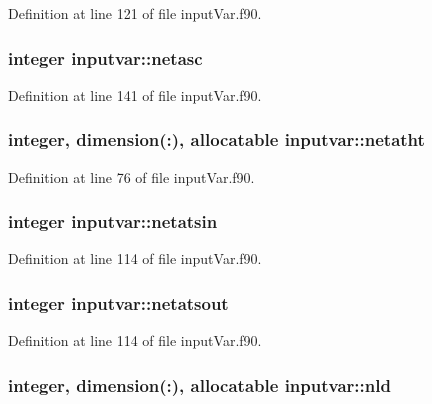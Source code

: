 Definition at line 121 of file input\-Var.\-f90.

\hypertarget{classinputvar_a803bd9bf1eb3b3aaa4e498bbad5c89c9}{
\subsubsection[{netasc}]{\setlength{\rightskip}{0pt plus 5cm}integer inputvar\-::netasc}}\label{classinputvar_a803bd9bf1eb3b3aaa4e498bbad5c89c9}


Definition at line 141 of file input\-Var.\-f90.

\hypertarget{classinputvar_acebcf3d64f116183dd364e920288729f}{
\subsubsection[{netatht}]{\setlength{\rightskip}{0pt plus 5cm}integer, dimension(\-:), allocatable inputvar\-::netatht}}\label{classinputvar_acebcf3d64f116183dd364e920288729f}


Definition at line 76 of file input\-Var.\-f90.

\hypertarget{classinputvar_accdc85c467baf46e33e1237e719ad174}{
\subsubsection[{netatsin}]{\setlength{\rightskip}{0pt plus 5cm}integer inputvar\-::netatsin}}\label{classinputvar_accdc85c467baf46e33e1237e719ad174}


Definition at line 114 of file input\-Var.\-f90.

\hypertarget{classinputvar_ac0b8841a56f7e91ebd3c2878d4499c2b}{
\subsubsection[{netatsout}]{\setlength{\rightskip}{0pt plus 5cm}integer inputvar\-::netatsout}}\label{classinputvar_ac0b8841a56f7e91ebd3c2878d4499c2b}


Definition at line 114 of file input\-Var.\-f90.

\hypertarget{classinputvar_a8c5a23a5a519fb86c67fc1465aef0e33}{
\subsubsection[{nld}]{\setlength{\rightskip}{0pt plus 5cm}integer, dimension(\-:), allocatable inputvar\-::nld}}\label{classinputvar_a8c5a23a5a519fb86c67fc1465aef0e33}


